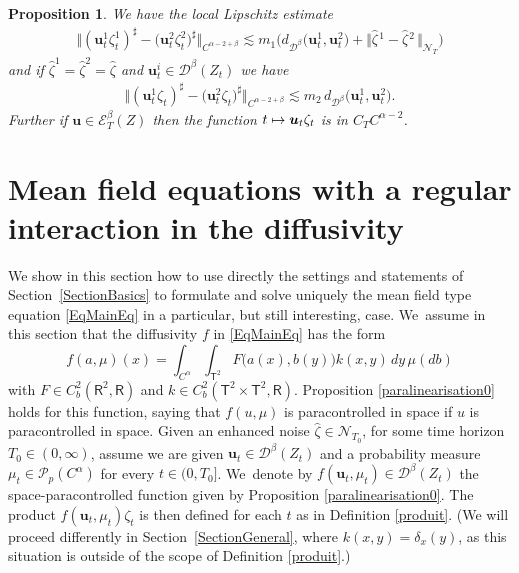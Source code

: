 \documentclass[JEP,XML,SOM,Unicode,published]{cedram}
\newcommand\mto{\mathchoice{\longmapsto}{\mapsto}{\mapsto}{\mapsto}}
\newtheorem{prop}[thm]{Proposition}
\theoremstyle{definition}
\newcommand\bbR{\mathbf{\mathsf{R}}}
\newcommand{\mcD}{\mathcal{D}}
\newcommand{\mcE}{\mathcal{E}}
\newcommand{\mcN}{\mathcal{N}}
\newcommand{\mcP}{\mathcal{P}}
\newcommand{\bsu}{\boldsymbol{u}}
\begin{document}
\begin{prop} \label{PropLocalLipschitzSharp}
We have the local Lipschitz estimate
\begin{align*}
\big\Vert(\bsu^1_t\zeta^1_t)^\sharp - \bigl(\bsu^2_t \zeta^2_t\bigr)^\sharp\big\Vert_{C^{\alpha-2+\beta}} \lesssim m_1\bigl(d_{\mcD^\beta}\bigl(\bsu^1_t, \bsu^2_t\bigr) + \big\Vert \widehat\zeta\hspace{1pt}^1 - \widehat\zeta\hspace{1pt}^2\,\big\Vert_{{\boldsymbol{\mcN}}_T} \bigr)
\end{align*}
and if $\widehat\zeta^1=\widehat\zeta^2=\widehat\zeta$ and $\bsu^i_t\in\mcD^\beta(Z_t)$ we have
\begin{align*}
\big\Vert(\bsu^1_t\zeta_t)^\sharp - \bigl(\bsu^2_t \zeta_t\bigr)^\sharp\big\Vert_{C^{\alpha-2+\beta}} \lesssim m_2 \, d_{\mcD^\beta}\bigl(\bsu^1_t, \bsu^2_t\bigr).
\end{align*}
Further if $\bsu\in\mcE^\beta_T(Z)$ then the function $t\mto \bsu_t\zeta_t$ is in $C_TC^{\alpha-2}$.
\end{prop}

\section{Mean field equations with a regular interaction in the diffusivity}
\label{SectionRegularInteraction}

We show in this section how to use directly the settings and statements of Section~\ref{SectionBasics} to formulate and solve uniquely the mean field type equation \eqref{EqMainEq} in a particular, but still interesting, case. We~assume in this section that the diffusivity $f$ in \eqref{EqMainEq} has the form
\begin{equation} \label{EqFormulaFNiceKernel}
f(a,\mu)(x) = \int_{C^\alpha}\int_{\mathsf{T}^2} F\bigl(a(x), b(y)\bigr)k(x,y) \, dy \, \mu(db)
\end{equation}
with $F\in C^{ 2}_b(\bbR^2,\bbR)$ and $k\in C^2_b(\mathsf{T}^2\times\mathsf{T}^2,\bbR)$. Proposition \ref{paralinearisation0} holds for this function, saying that $f(u,\mu)$ is paracontrolled in space if $u$ is paracontrolled in space. Given an enhanced noise $\widehat{\zeta}\in{{\boldsymbol{\mcN}}_{T_0}}$, for some time horizon $T_0\in(0,\infty)$, assume we are given $\bsu_t\in\mcD^\beta(Z_t)$ and a probability measure $\mu_t\in\mcP_p(C^\alpha)$ for every $t\in(0,T_0]$. We~denote by $f(\bsu_t,\mu_t)\in \mcD^\beta(Z_t)$ the space-paracontrolled function given by Proposition \ref{paralinearisation0}. The product $f(\bsu_t,\mu_t)\zeta_t$ is then defined for each $t$ as in Definition \ref{produit}. (We will proceed differently in Section~\ref{SectionGeneral}, where $k(x,y)=\delta_x(y)$, as this situation is outside of the scope of Definition \ref{produit}.)
\end{document}
